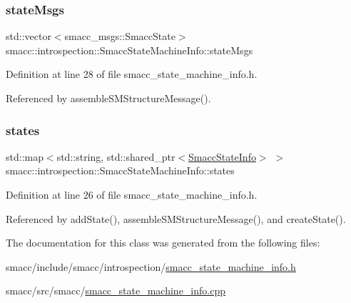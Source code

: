 \subsubsection{\texorpdfstring{state\+Msgs}{stateMsgs}}
{\footnotesize\ttfamily std\+::vector$<$smacc\+\_\+msgs\+::\+Smacc\+State$>$ smacc\+::introspection\+::\+Smacc\+State\+Machine\+Info\+::state\+Msgs}



Definition at line 28 of file smacc\+\_\+state\+\_\+machine\+\_\+info.\+h.



Referenced by assemble\+S\+M\+Structure\+Message().

\mbox{\label{classsmacc_1_1introspection_1_1SmaccStateMachineInfo_aef31d74ad3669f0b0f57fe0e008cd2f8}} 
\subsubsection{\texorpdfstring{states}{states}}
{\footnotesize\ttfamily std\+::map$<$std\+::string, std\+::shared\+\_\+ptr$<$\hyperlink{classsmacc_1_1introspection_1_1SmaccStateInfo}{Smacc\+State\+Info}$>$ $>$ smacc\+::introspection\+::\+Smacc\+State\+Machine\+Info\+::states}



Definition at line 26 of file smacc\+\_\+state\+\_\+machine\+\_\+info.\+h.



Referenced by add\+State(), assemble\+S\+M\+Structure\+Message(), and create\+State().



The documentation for this class was generated from the following files\+:\begin{DoxyCompactItemize}
\item 
smacc/include/smacc/introspection/\hyperlink{smacc__state__machine__info_8h}{smacc\+\_\+state\+\_\+machine\+\_\+info.\+h}\item 
smacc/src/smacc/\hyperlink{smacc__state__machine__info_8cpp}{smacc\+\_\+state\+\_\+machine\+\_\+info.\+cpp}\end{DoxyCompactItemize}
